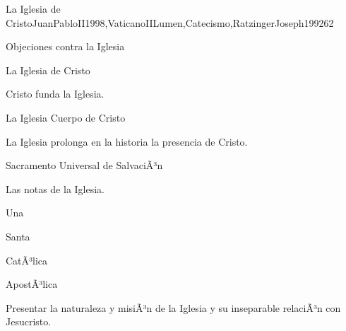 \begin{syllabus}
\begin{unit}{La Iglesia de Cristo}{JuanPabloII1998,VaticanoIILumen,Catecismo,RatzingerJoseph1992}{6}{2}
\begin{topics}
      \item Objeciones contra la Iglesia
      \item La Iglesia de Cristo
      \begin{inparaenum}
      \item Cristo funda la Iglesia. 
      \item La Iglesia Cuerpo de Cristo
      \item La Iglesia prolonga en la historia la presencia de Cristo.
      \item Sacramento Universal de SalvaciÃ³n
\end{inparaenum}
      \item Las notas de la Iglesia.
      \begin{inparaenum}
      \item Una
      \item Santa
      \item CatÃ³lica 
      \item ApostÃ³lica
\end{inparaenum}     

\end{topics}

\begin{unitgoals}
      \item Presentar la naturaleza y misiÃ³n de la Iglesia y su inseparable relaciÃ³n con Jesucristo.
\end{unitgoals}
\end{unit}



\begin{coursebibliography}
\end{coursebibliography}

\end{syllabus}
